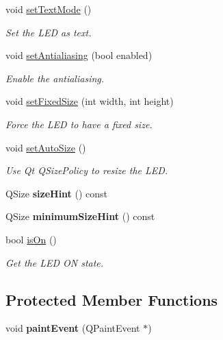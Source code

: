 \begin{DoxyCompactItemize}
void \hyperlink{classmdt_led_a6aabb78ea686814f316f88e20d024d39}{setTextMode} ()
\begin{DoxyCompactList}\small\item\em Set the LED as text. \end{DoxyCompactList}\item 
void \hyperlink{classmdt_led_ab8a997e610a2ad5572e1a6dbe7fbc256}{setAntialiasing} (bool enabled)
\begin{DoxyCompactList}\small\item\em Enable the antialiasing. \end{DoxyCompactList}\item 
void \hyperlink{classmdt_led_abd0fde0ce1eca75fe7c832557829089b}{setFixedSize} (int width, int height)
\begin{DoxyCompactList}\small\item\em Force the LED to have a fixed size. \end{DoxyCompactList}\item 
void \hyperlink{classmdt_led_a696570e6eb8f5b0a629fc6823ed2fe4d}{setAutoSize} ()
\begin{DoxyCompactList}\small\item\em Use Qt QSizePolicy to resize the LED. \end{DoxyCompactList}\item 
\hypertarget{classmdt_led_a44cf6e19e2640bc843d1ed096843e686}{
QSize {\bfseries sizeHint} () const }
\label{classmdt_led_a44cf6e19e2640bc843d1ed096843e686}

\item 
\hypertarget{classmdt_led_ae7d22257f19d57771299b321a8a17c50}{
QSize {\bfseries minimumSizeHint} () const }
\label{classmdt_led_ae7d22257f19d57771299b321a8a17c50}

\item 
\hypertarget{classmdt_led_a97c9b46867c260cb27901e2968146809}{
bool \hyperlink{classmdt_led_a97c9b46867c260cb27901e2968146809}{isOn} ()}
\label{classmdt_led_a97c9b46867c260cb27901e2968146809}

\begin{DoxyCompactList}\small\item\em Get the LED ON state. \end{DoxyCompactList}\end{DoxyCompactItemize}
\subsection*{Protected Member Functions}
\begin{DoxyCompactItemize}
\item 
\hypertarget{classmdt_led_a1c96c8e06658ba569f7cf6b3fc3f5903}{
void {\bfseries paintEvent} (QPaintEvent $\ast$)}
\label{classmdt_led_a1c96c8e06658ba569f7cf6b3fc3f5903}

\end{DoxyCompactItemize}



